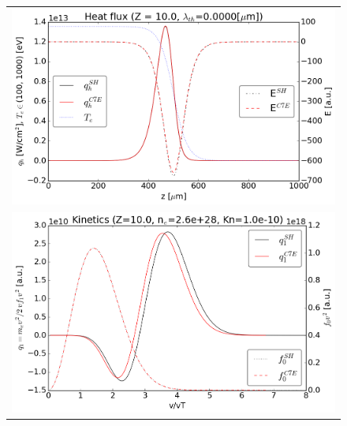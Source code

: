 \documentclass[preprint,12pt]{elsarticle}
\begin{document}
\begin{figure}[tbh]
  \begin{center}
    \begin{tabular}{c}
      \includegraphics[width=1.0\textwidth]{../results/fe_analysis/C7E/P5_heatflux_Z10_fullF.png} \\ 
      \includegraphics[width=1.0\textwidth]{../results/fe_analysis/C7E/P5_kinetics_Z10_fullF.png}
    \end{tabular}
  \caption{
  }
  \end{center}
  \label{fig:AWBScorrection_f1}
\end{figure}
\end{document}
